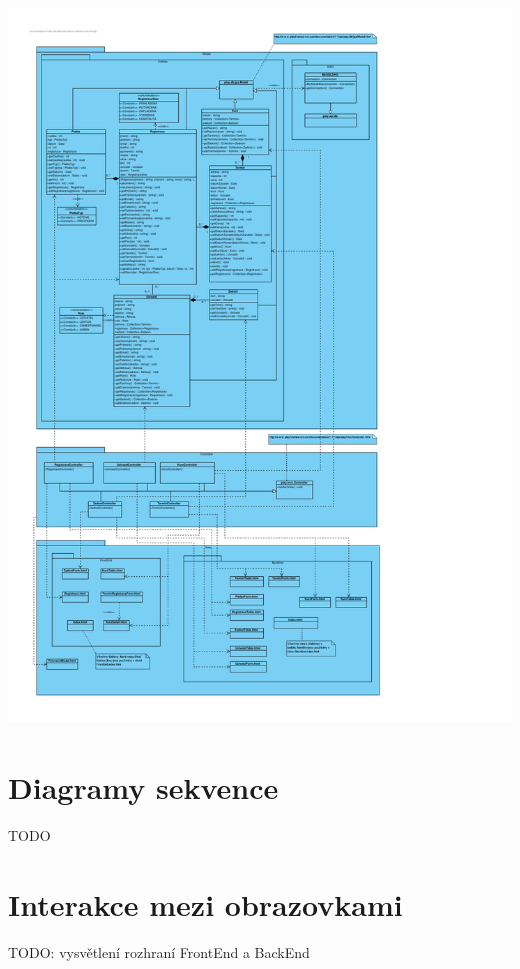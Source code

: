 \documentclass[12pt,a4paper,titlepage,final]{report}
\begin{document}
		\begin{center}
			\captionsetup{type=figure}
			\includegraphics[height=19cm]{img/architektura-detail.pdf}
		\end{center}

		
\section{Diagramy sekvence}

TODO
		
\section{Interakce mezi obrazovkami}

	TODO: vysvětlení rozhraní FrontEnd a BackEnd
\end{document}
